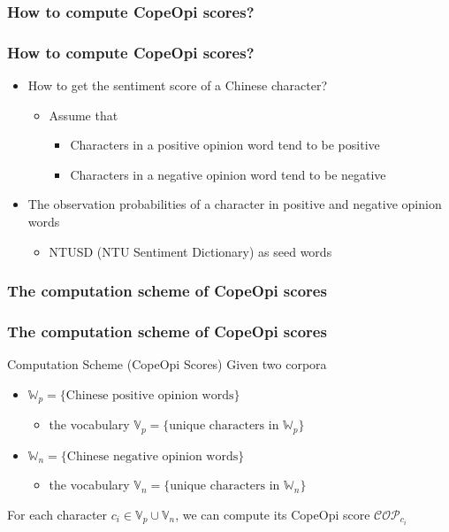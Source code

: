 \documentclass[mathserif]{beamer}
\begin{document}
\subsubsection{How to compute CopeOpi scores?}
\begin{frame}
\frametitle{How to compute CopeOpi scores?}
\begin{itemize}
\item How to get the sentiment score of a Chinese character?
	\begin{itemize}
	\item Assume that
		\begin{itemize}
		\item Characters in a positive opinion word tend to be positive
		\item Characters in a negative opinion word tend to be negative
		\end{itemize}
	\end{itemize}
\item The observation probabilities of a character in positive and negative opinion words
	\begin{itemize}
	\item NTUSD (NTU Sentiment Dictionary)\cite{Ku2007ntusd} as seed words
	\end{itemize}
\end{itemize}
\end{frame}
\subsubsection{The computation scheme of CopeOpi scores}
\begin{frame}
\frametitle{The computation scheme of CopeOpi scores}
\begin{block}{Computation Scheme (CopeOpi Scores)}
Given two corpora
\begin{itemize}
\item $\mathbb{W}_p=\{\text{Chinese positive opinion words}\}$
	\begin{itemize}
	\item the vocabulary $\mathbb{V}_p=\{\text{unique characters in }\mathbb{W}_p\}$
	\end{itemize}
\item $\mathbb{W}_n=\{\text{Chinese negative opinion words}\}$
	\begin{itemize}
	\item the vocabulary $\mathbb{V}_n=\{\text{unique characters in }\mathbb{W}_n\}$
	\end{itemize}
\end{itemize}
For each character $c_i \in \mathbb{V}_p \cup \mathbb{V}_n$, we can compute its CopeOpi score $\mathcal{COP}_{c_i}$
\end{block}
\end{frame}
\end{document}

